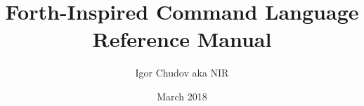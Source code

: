 \documentclass[a4paper,12pt]{book}
\begin{document}
\author{Igor Chudov aka NIR}
\title{Forth-Inspired Command Language Reference Manual}
\date{March 2018}

\frontmatter
\maketitle
\tableofcontents

\mainmatter

\backmatter
\end{document}

